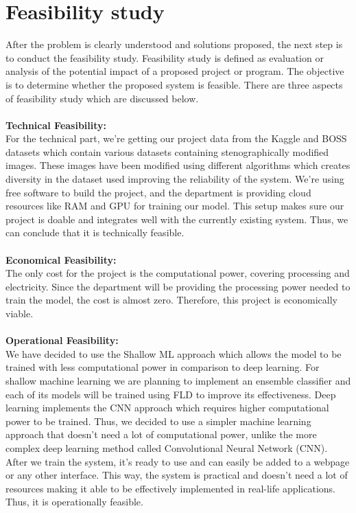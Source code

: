 \chapter{Feasibility study} \sloppy
After the problem is clearly understood and solutions proposed, the next step is to conduct the
feasibility study. Feasibility study is defined as evaluation or analysis of the potential impact
of a proposed project or program. The objective is to determine whether the proposed system
is feasible. There are three aspects of feasibility study which are discussed below.\\ \\
\textbf{Technical Feasibility:}\\For the technical part, we're getting our project data from the Kaggle and BOSS datasets which contain various datasets containing stenographically modified images. These images have been modified using different algorithms which creates diversity in the dataset used improving the reliability of the system. We're using free software to build the project, and the department is providing cloud resources like RAM and GPU for training our model. This setup makes sure our project is doable and integrates well with the currently existing system. Thus, we can conclude that it is technically feasible.\\ \\
\textbf{Economical Feasibility:}\\The only cost for the project is the computational power, covering processing and electricity. Since the department will be providing the processing power needed to train the model, the cost is almost zero. Therefore, this project is economically viable.\\ \\
\textbf{Operational Feasibility:}\\We have decided to use the Shallow ML approach which allows the model to be trained with less computational power in comparison to deep learning. For shallow machine learning we are planning to implement an ensemble classifier and each of its models will be trained using FLD to improve its effectiveness. Deep learning implements the CNN approach which requires higher computational power to be trained. Thus, we decided to use a simpler machine learning approach that doesn't need a lot of computational power, unlike the more complex deep learning method called Convolutional Neural Network (CNN). After we train the system, it's ready to use and can easily be added to a webpage or any other interface. This way, the system is practical and doesn't need a lot of resources making it able to be effectively implemented in real-life applications. Thus, it is operationally feasible.
\\
